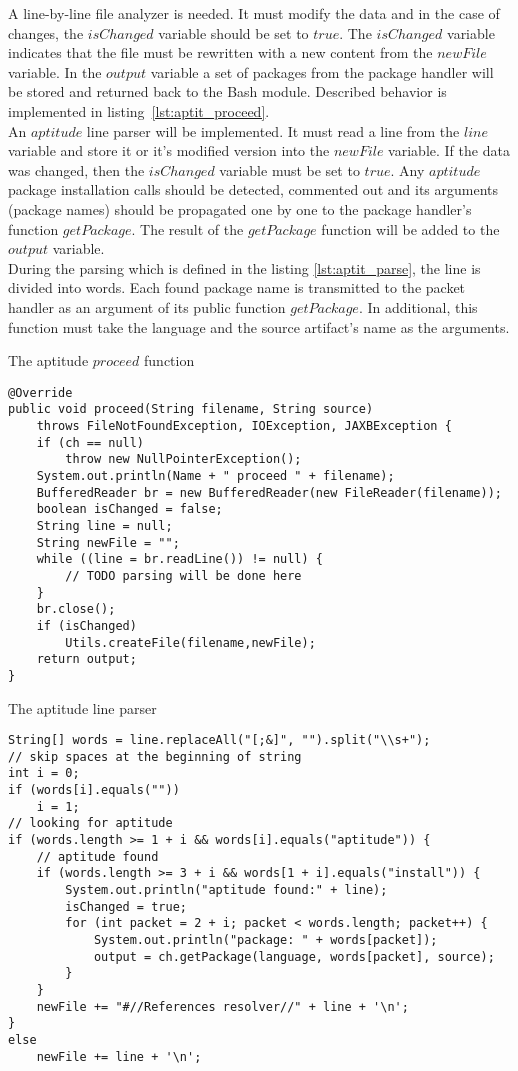 A line-by-line file analyzer is needed.
It must modify the data and in the case of changes, the $isChanged$ variable should be set to $true$.
The $isChanged$ variable indicates that the file must be rewritten with a new content from the $newFile$ variable.
In the $output$ variable a set of packages from the package handler will be stored and returned back to the Bash module.
Described behavior is implemented in listing~\ref{lst:aptit_proceed}.\\
An $aptitude$ line parser will be implemented.
It must read a line from the $line$ variable and store it or it's modified version into the $newFile$ variable.
If the data was changed, then the $isChanged$ variable must be set to $true$.
Any $aptitude$ package installation calls should be detected, commented out and its arguments (package names) should be propagated one by one to the package handler's function $getPackage$. 
The result of the $getPackage$ function will be added to the $output$ variable.\\
During the parsing which is defined in the listing \ref{lst:aptit_parse}, the line is divided into words. 
Each found package name is transmitted to the packet handler as an argument of its public function $getPackage$.
In additional, this function must take the language and the source artifact's name as the arguments.
\begin{Listing} 
\caption{The aptitude $proceed$ function}
\label{lst:aptit_proceed}
\begin{lstlisting}
@Override
public void proceed(String filename, String source)
	throws FileNotFoundException, IOException, JAXBException {
	if (ch == null)
		throw new NullPointerException();
	System.out.println(Name + " proceed " + filename);
	BufferedReader br = new BufferedReader(new FileReader(filename));
	boolean isChanged = false;
	String line = null;
	String newFile = "";
	while ((line = br.readLine()) != null) {
		// TODO parsing will be done here
	}
	br.close();
	if (isChanged)
		Utils.createFile(filename,newFile);
	return output;
}	 
\end{lstlisting}
\end{Listing} 
\begin{Listing} 
\caption{The aptitude line parser}
\label{lst:aptit_parse}
\begin{lstlisting}
String[] words = line.replaceAll("[;&]", "").split("\\s+");
// skip spaces at the beginning of string
int i = 0;
if (words[i].equals(""))
	i = 1;
// looking for aptitude 
if (words.length >= 1 + i && words[i].equals("aptitude")) {
	// aptitude found
	if (words.length >= 3 + i && words[1 + i].equals("install")) {
		System.out.println("aptitude found:" + line);
		isChanged = true;
		for (int packet = 2 + i; packet < words.length; packet++) {
			System.out.println("package: " + words[packet]);
			output = ch.getPackage(language, words[packet], source);
		}
	}
	newFile += "#//References resolver//" + line + '\n';
} 
else
	newFile += line + '\n';
\end{lstlisting}
\end{Listing} 
